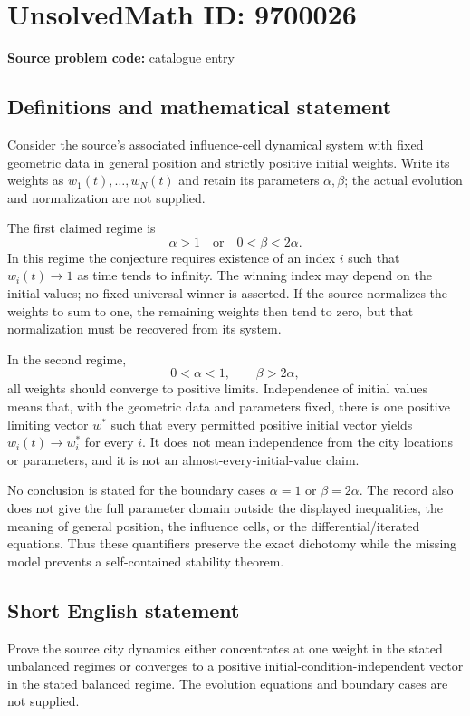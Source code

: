 \documentclass[11pt]{article}
\begin{document}
\section*{UnsolvedMath ID: 9700026}
\textbf{Source problem code:} catalogue entry
\subsection{Definitions and mathematical statement}
Consider the source's associated influence-cell dynamical system with fixed geometric data in general position and strictly positive initial weights. Write its weights as $w_1(t),\ldots,w_N(t)$ and retain its parameters $\alpha,\beta$; the actual evolution and normalization are not supplied.

The first claimed regime is
\[
\alpha>1\quad\text{or}\quad0<\beta<2\alpha.
\]
In this regime the conjecture requires existence of an index $i$ such that $w_i(t)\to1$ as time tends to infinity. The winning index may depend on the initial values; no fixed universal winner is asserted. If the source normalizes the weights to sum to one, the remaining weights then tend to zero, but that normalization must be recovered from its system.

In the second regime,
\[
0<\alpha<1,\qquad \beta>2\alpha,
\]
all weights should converge to positive limits. Independence of initial values means that, with the geometric data and parameters fixed, there is one positive limiting vector $w^*$ such that every permitted positive initial vector yields $w_i(t)\to w_i^*$ for every $i$. It does not mean independence from the city locations or parameters, and it is not an almost-every-initial-value claim.

No conclusion is stated for the boundary cases $\alpha=1$ or $\beta=2\alpha$. The record also does not give the full parameter domain outside the displayed inequalities, the meaning of general position, the influence cells, or the differential/iterated equations. Thus these quantifiers preserve the exact dichotomy while the missing model prevents a self-contained stability theorem.
\subsection{Short English statement}
Prove the source city dynamics either concentrates at one weight in the stated unbalanced regimes or converges to a positive initial-condition-independent vector in the stated balanced regime. The evolution equations and boundary cases are not supplied.
\end{document}
